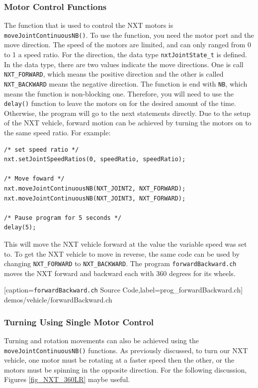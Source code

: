 \documentclass[11pt]{article}
\begin{document}
\subsubsection{Motor Control Functions}
The function that is used to control the NXT motors is {\tt moveJointContinuousNB()}. 
To use the function, you need the motor port and the move direction. The speed 
of the motors are limited, and can only ranged from 0 to 1 a speed ratio. For 
the direction, the data type {\tt nxtJointState\_t} is defined. In the data type, 
there are two values indicate the move directions. One is call {\tt NXT\_FORWARD},
which means the positive direction and the other is called {\tt NXT\_BACKWARD} 
means the negative direction. The function is end with {\tt NB}, which means the 
function is non-blocking one. Therefore, you will need to use the {\tt delay()} 
function to leave the motors on for the desired amount of the time. Otherwise, 
the program will go to the next statements directly. Due to the setup of the NXT 
vehicle, forward motion can be achieved by turning the motors on to the same speed 
ratio. For example:
\begin{lstlisting}
/* set speed ratio */
nxt.setJointSpeedRatios(0, speedRatio, speedRatio);

/* Move foward */
nxt.moveJointContinuousNB(NXT_JOINT2, NXT_FORWARD);
nxt.moveJointContinuousNB(NXT_JOINT3, NXT_FORWARD);

/* Pause program for 5 seconds */
delay(5);
\end{lstlisting}
This will move the NXT vehicle forward at the value the variable speed was set to. 
To get the NXT vehicle to move in reverse, the same code can be used by changing 
{\tt NXT\_FORWARD} to {\tt NXT\_BACKWARD}. The program {\tt forwardBackward.ch} 
moves the NXT forward and backward each with 360 degrees for its wheels.

    [caption={{\tt forwardBackward.ch} Source Code},label=prog_forwardBackward.ch]
    {demos/vehicle/forwardBackward.ch}
\subsubsection{Turning Using Single Motor Control}
Turning and rotation movements can also be achieved using the {\tt moveJointContinuousNB()}
functions. As previously discussed, to turn our NXT vehicle, one motor must be 
rotating at a faster speed then the other, or the motors must be spinning in the 
opposite direction. For the following discussion, Figures \ref{fig_NXT_360LR} 
maybe useful.\\
\end{document}
